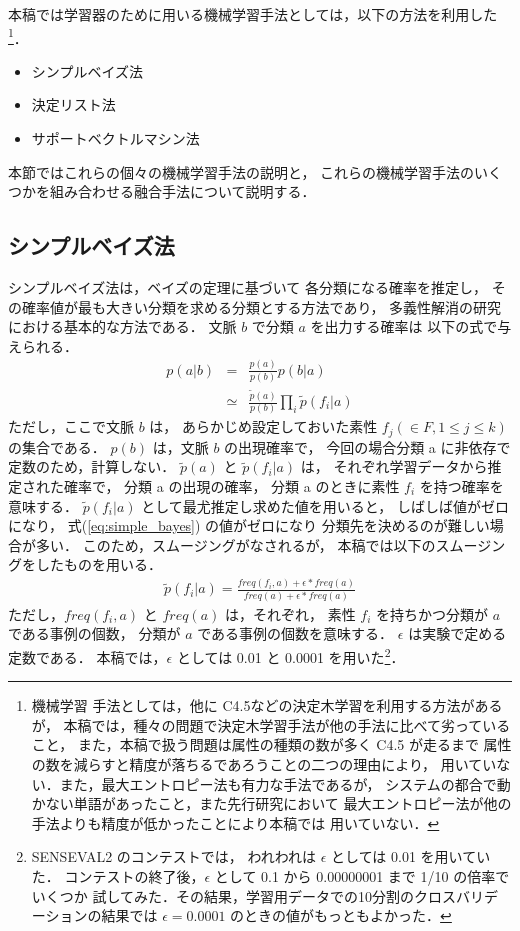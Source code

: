 本稿では学習器のために用いる機械学習手法としては，以下の方法を利用した\footnote{機械学習
手法としては，他に C4.5\cite{c4.5j}などの決定木学習を利用する方法があるが，
本稿では，種々の問題で決定木学習手法が他の手法に比べて劣っている
こと\cite{murata:nlken98,murata_haihan_rule_ipsj,taira_svm}，
また，本稿で扱う問題は属性の種類の数が多く C4.5 が走るまで
属性の数を減らすと精度が落ちるであろうことの二つの理由により，
用いていない．また，最大エントロピー法も有力な手法であるが，
システムの都合で動かない単語があったこと，また先行研究\cite{murata_nlc2001_wsd}において
最大エントロピー法が他の手法よりも精度が低かったことにより本稿では
用いていない．}．
\begin{itemize}
\item 
  シンプルベイズ法
\item 
  決定リスト法
\item 
  サポートベクトルマシン法
\end{itemize}
本節ではこれらの個々の機械学習手法の説明と，
これらの機械学習手法のいくつかを組み合わせる融合手法について説明する．

\subsection{シンプルベイズ法}

シンプルベイズ法は，ベイズの定理に基づいて
各分類になる確率を推定し，
その確率値が最も大きい分類を求める分類とする方法であり，
多義性解消の研究における基本的な方法である．
文脈 $b$ で分類 $a$ を出力する確率は
以下の式で与えられる．
{
\begin{eqnarray}
  p(a|b)  & = & \frac{p(a)}{p(b)}p(b|a)\\ 
  \label{eq:simple_bayes}
  & \simeq & \frac{\tilde{p}(a)}{p(b)} \prod_i \tilde{p}(f_i|a)
\end{eqnarray}
}
ただし，ここで文脈 $b$ は，
あらかじめ設定しておいた素性 $f_j (\in F, 1\leq j\leq k)$ 
の集合である．
$p(b)$ は，文脈 $b$ の出現確率で，
今回の場合分類 a に非依存で定数のため，計算しない．
$\tilde{p}(a)$ と $\tilde{p}(f_i|a)$ は，
それぞれ学習データから推定された確率で，
分類 a の出現の確率，
分類 a のときに素性 $f_i$ を持つ確率を意味する．
$\tilde{p}(f_i|a)$ として最尤推定し求めた値を用いると，
しばしば値がゼロになり，
式(\ref{eq:simple_bayes}) の値がゼロになり
分類先を決めるのが難しい場合が多い．
このため，スムージングがなされるが，
本稿では以下のスムージングをしたものを用いる．
{
\begin{eqnarray}
  \label{eq:simple_bayes2}
  \tilde{p}(f_i|a) = \frac{freq(f_i,a)+\epsilon*freq(a)}{freq(a)+\epsilon*freq(a)}
\end{eqnarray}
}
ただし，$freq(f_i,a)$ と $freq(a)$ は，それぞれ，
素性 $f_i$ を持ちかつ分類が $a$ である事例の個数，
分類が $a$ である事例の個数を意味する．
$\epsilon$ は実験で定める定数である．
本稿では，$\epsilon$ としては 0.01 と 0.0001 を用いた\footnote{\label{fn:bayes_epsilon} SENSEVAL2 のコンテストでは，
われわれは $\epsilon$ としては 0.01 を用いていた．
コンテストの終了後，$\epsilon$ として 0.1 から 0.00000001 まで 1/10 の倍率でいくつか
試してみた．その結果，学習用データでの10分割のクロスバリデーションの結果では
$\epsilon = 0.0001$ のときの値がもっともよかった．}．


